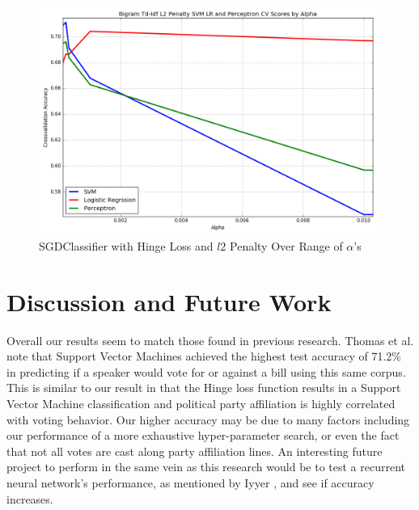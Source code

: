 \documentclass[a4paper, 12pt]{article}
\begin{document}
\begin{figure}[!ht]
\centering
\includegraphics[width=0.5\linewidth]{ZoomedL2NormSVM.png}
\caption[SGDClassifier with Hinge Loss and $l2$ Penalty Over a Range of $\alpha$ ]{SGDClassifier with Hinge Loss and $l2$ Penalty Over Range of $\alpha$'s}
\label{fig: sgd}
\end{figure}

\section{Discussion and Future Work}
Overall our results seem to match those found in previous research. Thomas et al. note \cite{thomas2006get} that Support Vector Machines achieved the highest test accuracy of 71.2\% in predicting if a speaker would vote for or against a bill using this same corpus. This is similar to our result in that the Hinge loss function results in a Support Vector Machine classification and political party affiliation is highly correlated with voting behavior.  Our higher accuracy may be due to many factors including our performance of a more exhaustive hyper-parameter search, or even the fact that not all votes are cast along party affiliation lines. An interesting future project to perform in the same vein as this research would be to test a recurrent neural network's performance, as mentioned by Iyyer \cite{iyyer2014political}, and see if accuracy increases. 
\newpage


\end{document}
